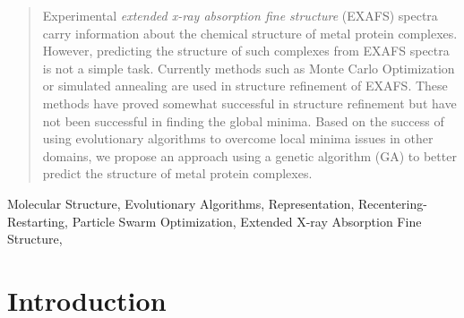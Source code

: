 \documentclass[conference]{IEEEtran}
\begin{document}




\maketitle


\begin{abstract}

Experimental \textit{extended x-ray absorption fine structure} (EXAFS) spectra carry information about the chemical structure of metal protein complexes. However, predicting the structure of such complexes from EXAFS spectra is not a simple task. Currently methods such as Monte Carlo Optimization or simulated annealing are used in structure refinement of EXAFS. These methods have proved somewhat successful in structure refinement but have not been successful in finding the global minima. Based on the success of using evolutionary algorithms to overcome local minima issues in other domains, we propose an approach using a genetic algorithm (GA) to better predict the structure of metal protein complexes.

\end{abstract}

\begin{IEEEkeywords}
Molecular Structure, Evolutionary Algorithms, Representation, Recentering-Restarting, Particle Swarm Optimization, Extended X-ray Absorption Fine Structure,
\end{IEEEkeywords}



%
\IEEEpeerreviewmaketitle

\section{Introduction}
\end{document}
